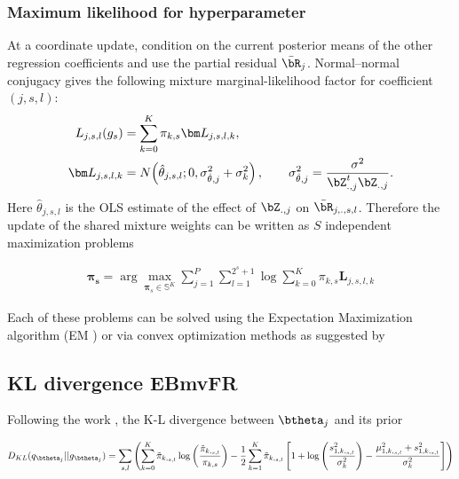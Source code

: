 \subsubsection{Maximum likelihood for hyperparameter}\label{subsec:detalEBmvFR_hyper}

At a coordinate update, condition on the current posterior means of the other regression coefficients and use the partial residual $\bar{\bR}_j$. Normal--normal conjugacy gives the following mixture marginal-likelihood factor for coefficient $(j,s,l)$:
\begin{align}
    L_{j,s,l}(g_s)
    &=\sum_{k=0}^K\pi_{k,s}\bm L_{j,s,l,k},\\
    \bm L_{j,s,l,k}
    &=N\!\left(\hat\theta_{j,s,l};0,\sigma^2_{\hat\theta,j}+\sigma^2_k\right),
    \qquad
    \sigma^2_{\hat\theta,j}=\frac{\sigma^2}{\bZ_{.,j}^t\bZ_{.,j}}.
\end{align}
Here $\hat\theta_{j,s,l}$ is the OLS estimate of the effect of $\bZ_{.,j}$ on $\bar{\bR}_{j,.,s,l}$. Therefore the update of the shared mixture weights can be written as $S$ independent maximization problems

\begin{align}
    \bm{\pi_{s}}= \arg\max_{\bm\pi_s\in\mathbb{S}^K} \sum _{j=1}^P \sum _{ l=1}^{2^s+1} \log \sum _{k=0}^K \pi_{k,s} \bm{L}_{j,s,l,k} 
\end{align}

Each of these problems can be solved using the Expectation Maximization algorithm  (EM \citep{dempster_maximum_1977}) or via convex optimization methods as suggested by  \cite{kim_fast_2019}



\subsection{KL divergence EBmvFR}\label{subsec:detalEBmvFR_KL}


Following the work \cite{kim_flexible_2022}, the K-L divergence between $\btheta_j$ and its prior 


\begin{align}\label{eq:KL_EBmvFR}
    D_{KL}(q_{\btheta_j}||g_{\btheta_j}) = \sum_{s,l}\left( \sum_ {k=0}^K \Tilde{\pi}_{k, _{s,l}}\log\left(\frac{\Tilde{\pi}_{k, _{s,l}}}{\pi_{k,s}} \right) -\frac{1}{2}\sum_{k=1}^K  \Tilde{\pi}_{k, _{s,l}}\left[   1 +\log \left( \frac{s^2_{1,k,_{s,l}}}{\sigma^2_k}\right) - \frac{\mu_{1,k,_{s,l}}^2+s^2_{1,k,_{s,l}}}{\sigma^2_k}\right] \right)
\end{align}


